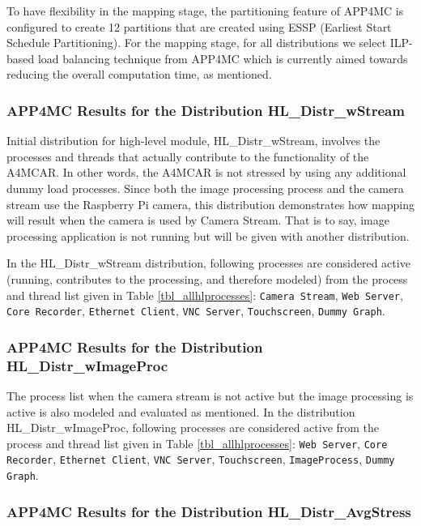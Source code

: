 To have flexibility in the mapping stage, the partitioning feature of APP4MC is configured to create 12 partitions that are created using ESSP (Earliest Start Schedule Partitioning). For the mapping stage, for all distributions we select ILP-based load balancing technique from APP4MC which is currently aimed towards reducing the overall computation time, as mentioned.

\allhlprocesses

\subsubsection{APP4MC Results for the Distribution HL{\_}Distr{\_}wStream}

Initial distribution for high-level module, HL{\_}Distr{\_}wStream, involves the processes and threads that actually contribute to the functionality of the A4MCAR. In other words, the A4MCAR is not stressed by using any additional dummy load processes. Since both the image processing process and the camera stream use the Raspberry Pi camera, this distribution demonstrates how mapping will result when the camera is used by Camera Stream. That is to say, image processing application is not running but will be given with another distribution. 

In the HL{\_}Distr{\_}wStream distribution, following processes are considered active (running, contributes to the processing, and therefore modeled) from the process and thread list given in Table \ref{tbl_allhlprocesses}: \texttt{Camera Stream}, \texttt{Web Server}, \texttt{Core Recorder}, \texttt{Ethernet Client}, \texttt{VNC Server}, \texttt{Touchscreen}, \texttt{Dummy Graph}.


\subsubsection{APP4MC Results for the Distribution HL{\_}Distr{\_}wImageProc}

The process list when the camera stream is not active but the image processing is active is also modeled and evaluated as mentioned. In the distribution HL{\_}Distr{\_}wImageProc, following processes are considered active from the process and thread list given in Table \ref{tbl_allhlprocesses}: \texttt{Web Server}, \texttt{Core Recorder}, \texttt{Ethernet Client}, \texttt{VNC Server}, \texttt{Touchscreen}, \texttt{ImageProcess}, \texttt{Dummy Graph}.


\subsubsection{APP4MC Results for the Distribution HL{\_}Distr{\_}AvgStress}

